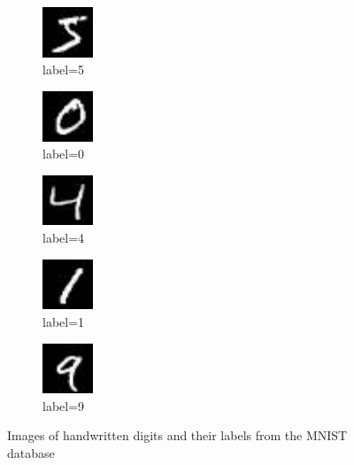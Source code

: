 \documentclass[11pt]{article}
\begin{document}
\begin{figure}
\begin{center}
\begin{subfigure}[t]{.15\textwidth}
\begin{center}
\includegraphics[width=1.5cm]{0.jpg}
\end{center}
\caption*{label=5}
\end{subfigure}
\begin{subfigure}[t]{.15\textwidth}
\begin{center}
\includegraphics[width=1.5cm]{1.jpg}
\end{center}
\caption*{label=0}
\end{subfigure}
\begin{subfigure}[t]{.15\textwidth}
\begin{center}
\includegraphics[width=1.5cm]{2.jpg}
\end{center}
\caption*{label=4}
\end{subfigure}
\begin{subfigure}[t]{.15\textwidth}
\begin{center}
\includegraphics[width=1.5cm]{3.jpg}
\end{center}
\caption*{label=1}
\end{subfigure}
\begin{subfigure}[t]{.15\textwidth}
\begin{center}
\includegraphics[width=1.5cm]{4.jpg}
\end{center}
\caption*{label=9}
\end{subfigure}
\end{center}
\caption[Handwritten Digit Samples]{Images of handwritten digits and their labels from the MNIST database \citep{mnistdb} \label{fig-mnist_digits}}
\end{figure}
\end{document}
